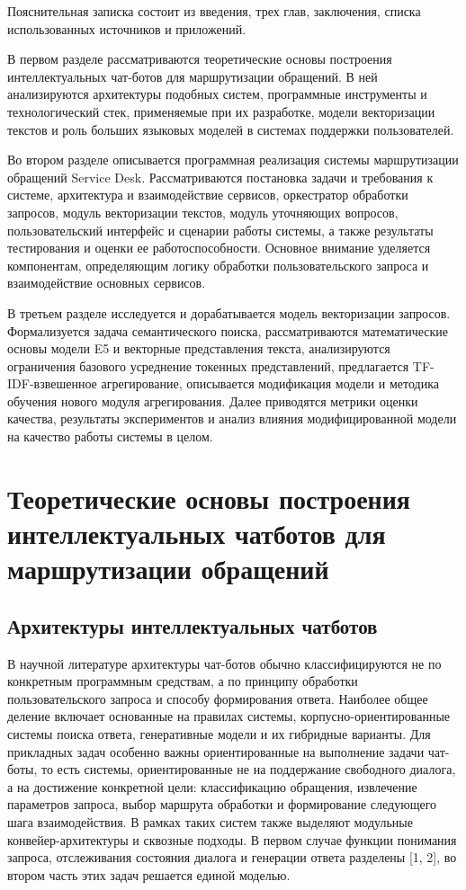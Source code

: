 \documentclass[14pt,a4paper]{extarticle}
\numberwithin{figure}{section}
\numberwithin{table}{section}
\begin{document}
Пояснительная записка состоит из введения, трех глав, заключения, списка
использованных источников и приложений.

В первом разделе рассматриваются теоретические основы построения
интеллектуальных чат-ботов для маршрутизации обращений. В ней
анализируются архитектуры подобных систем, программные инструменты и
технологический стек, применяемые при их разработке, модели векторизации
текстов и роль больших языковых моделей в системах поддержки
пользователей.

Во втором разделе описывается программная реализация системы маршрутизации
обращений Service Desk. Рассматриваются постановка задачи и требования к
системе, архитектура и взаимодействие сервисов, оркестратор обработки
запросов, модуль векторизации текстов, модуль уточняющих вопросов,
пользовательский интерфейс и сценарии работы системы, а также результаты
тестирования и оценки ее работоспособности. Основное внимание уделяется
компонентам, определяющим логику обработки пользовательского запроса и
взаимодействие основных сервисов.

В третьем разделе исследуется и дорабатывается модель векторизации
запросов. Формализуется задача семантического поиска, рассматриваются
математические основы модели E5 и векторные представления текста, анализируются
ограничения базового усреднение токенных представлений, предлагается TF-IDF-взвешенное
агрегирование, описывается модификация модели и методика обучения нового
модуля агрегирования. Далее приводятся метрики оценки качества, результаты
экспериментов и анализ влияния модифицированной модели на качество
работы системы в целом.

\clearpage
\section{Теоретические основы построения интеллектуальных чатботов для маршрутизации обращений}

\subsection{Архитектуры интеллектуальных чатботов}

В научной литературе архитектуры чат-ботов обычно классифицируются не по
конкретным программным средствам, а по принципу обработки
пользовательского запроса и способу формирования ответа. Наиболее общее
деление включает основанные на правилах системы, корпусно-ориентированные системы
поиска ответа, генеративные модели и их гибридные варианты. Для
прикладных задач особенно важны ориентированные на выполнение задачи чат-боты, то есть системы,
ориентированные не на поддержание свободного диалога, а на достижение
конкретной цели: классификацию обращения, извлечение параметров запроса,
выбор маршрута обработки и формирование следующего шага взаимодействия.
В рамках таких систем также выделяют модульные конвейер-архитектуры и
сквозные подходы. В первом случае функции понимания запроса,
отслеживания состояния диалога и генерации ответа разделены [1, 2], во
втором часть этих задач решается единой моделью.
\end{document}

